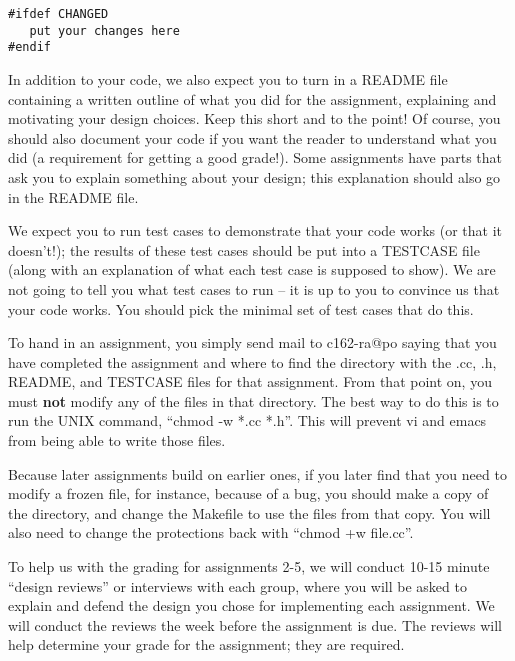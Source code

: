 \begin{verbatim}
#ifdef CHANGED
   put your changes here
#endif
\end{verbatim}

In addition to your code, we also expect you to turn in a
README file containing a written outline of what you did for 
the assignment, explaining and motivating your design choices.  
Keep this short and to the point!  Of course, you should also document 
your code if you want the reader to understand what you did (a requirement
for getting a good grade!).  Some assignments have parts that ask you 
to explain something about your design; this explanation should also go 
in the README file.

We expect you to run test cases to demonstrate that your 
code works (or that it doesn't!); the results of these test
cases should be put into a TESTCASE file (along with an explanation
of what each test case is supposed to show).  We are not going to tell
you what test cases to run -- it is up to you to convince us
that your code works.  You should pick the minimal set of test cases 
that do this. 

To hand in an assignment, you simply send mail to c162-ra@po
saying that you have completed the assignment and where to find
the directory with the .cc, .h, README, and TESTCASE files for 
that assignment.  From that point on, you must {\bf not} modify any 
of the files in that directory.  The best way to do 
this is to run the
UNIX command, ``chmod -w *.cc *.h''.  This will prevent vi and emacs
from being able to write those files.  

Because later assignments build on earlier ones, if you later find 
that you need to modify a frozen file, for instance, because of a bug, 
you should make a copy of the directory, and change the Makefile
to use the files from that copy.
You will also need to change the protections back with ``chmod +w file.cc''.

To help us with the grading for assignments 2-5, 
we will conduct 10-15 minute ``design reviews''
or interviews with each group, where you will be asked to explain 
and defend the design you chose for implementing each assignment.
We will conduct the reviews the week before the assignment is due.
The reviews will help determine your grade for the assignment; they
are required.


